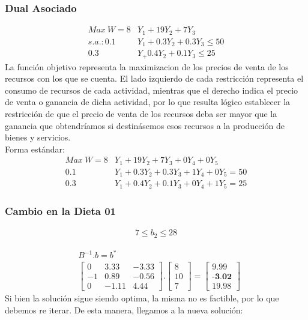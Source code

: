 \begin{homeworkProblem}
\subsubsection{Dual Asociado}
\begin{align*}
    Max\ W = 8&Y_1 + 19Y_2 + 7Y_3 \\
    s.a.: 0.1&Y_1 + 0.3Y_2 + 0.3Y_3 \le 50 \\
    0.3&Y_ + 0.4Y_2 + 0.1Y_3 \le 25
\end{align*}
La función objetivo representa la maximizacion de los precios de venta de los recursos con los que se cuenta. El lado izquierdo de cada restricción representa el consumo de recursos de cada actividad, mientras que el derecho indica el precio de venta o ganancia de dicha actividad, por lo que resulta lógico establecer la restricción de que el precio de venta de los recursos deba ser mayor que la ganancia que obtendríamos si destinásemos esos recursos a la producción de bienes y servicios. \\
Forma estándar:
\begin{align*}
    Max\ W = 8&Y_1 + 19Y_2 + 7Y_3 + 0Y_4 + 0Y_5 \\
     0.1&Y_1 + 0.3Y_2 + 0.3Y_3 + 1Y_4 + 0Y_5 = 50 \\
     0.3&Y_1 + 0.4Y_2 + 0.1Y_3 + 0Y_4 + 1Y_5 = 25
\end{align*}


\subsubsection{Cambio en la Dieta 01}
\begin{align*}
    7 \le b_2 \le 28
\end{align*}

\begin{align*}
  &B^{-1}.b = b^{*} \\
  &\begin{bmatrix}
   0 & 3.33 & -3.33 \\
   -1 & 0.89 & -0.56 \\
   0 & -1.11 & 4.44 
  \end{bmatrix}.
  \begin{bmatrix}
   8 \\
   10 \\
   7
  \end{bmatrix} =
  \begin{bmatrix}
   9.99 \\
   \textbf{-3.02} \\
   19.98
  \end{bmatrix}
\end{align*}
Si bien la solución sigue siendo optima, la misma no es factible, por lo que debemos re iterar. De esta manera, llegamos a la nueva solución:


\end{homeworkProblem}
